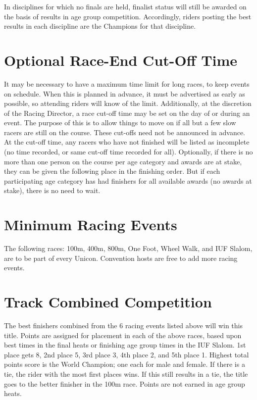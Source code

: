 In disciplines for which no finals are held, finalist status will still be awarded on the basis of results in age group competition.
Accordingly, riders posting the best results in each discipline are the Champions for that discipline.

\section{Optional Race-End Cut-Off Time}
It may be necessary to have a maximum time limit for long races, to keep events on schedule.
When this is planned in advance, it must be advertised as early as possible, so attending riders will know of the limit.
Additionally, at the discretion of the Racing Director, a race cut-off time may be set on the day of or during an event.
The purpose of this is to allow things to move on if all but a few slow racers are still on the course.
These cut-offs need not be announced in advance.
At the cut-off time, any racers who have not finished will be listed as incomplete (no time recorded, or same cut-off time recorded for all).
Optionally, if there is no more than one person on the course per age category and awards are at stake, they can be given the following place in the finishing order.
But if each participating age category has had finishers for all available awards (no awards at stake), there is no need to wait.

\section{Minimum Racing Events \label{sec:track-field_minimum-racing-events}}
The following races: 100m, 400m, 800m, One Foot, Wheel Walk, and IUF Slalom, are to be part of every Unicon.
Convention hosts are free to add more racing events.

\section{Track Combined Competition}
The best finishers combined from the 6 racing events listed above will win this title.
Points are assigned for placement in each of the above races, based upon best times in the final heats or finishing age group times in the IUF Slalom.
1st place gets 8, 2nd place 5, 3rd place 3, 4th place 2, and 5th place 1.
Highest total points score is the World Champion; one each for male and female.
If there is a tie, the rider with the most first places wins.
If this still results in a tie, the title goes to the better finisher in the 100m race.
Points are not earned in age group heats.

